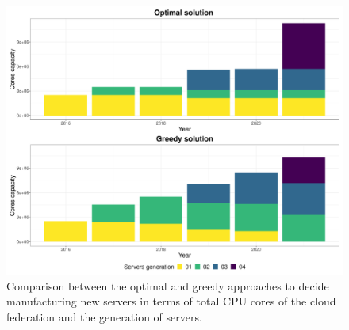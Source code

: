 \begin{figure}[ht]
\centering 
  \includegraphics[width=\linewidth]{images/cloud_federation_evolution_lifetime.png}
  \caption{Comparison between the optimal and greedy approaches to decide manufacturing new servers in terms of total CPU cores of the cloud federation and the generation of servers.}
  \label{fig:dc_evolution_comparison}
\end{figure}


